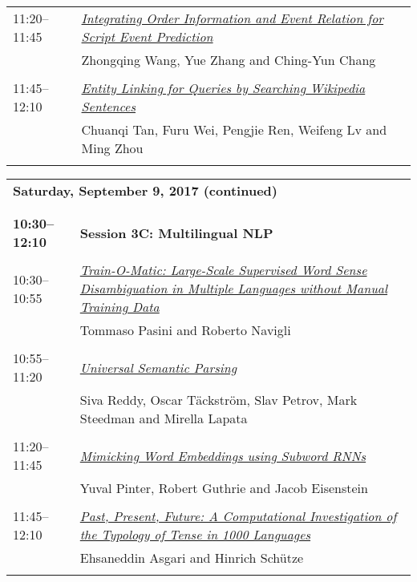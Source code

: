 \begin{tabular}{p{20mm}p{128mm}}
11:20--11:45 & \hyperlink{page.57}{\em Integrating Order Information and Event Relation for Script Event Prediction}\\
         & Zhongqing Wang, Yue Zhang and Ching-Yun Chang \\
\\

11:45--12:10 & \hyperlink{page.68}{\em Entity Linking for Queries by Searching Wikipedia Sentences}\\
         & Chuanqi Tan, Furu Wei, Pengjie Ren, Weifeng Lv and Ming Zhou \\
\\

\end{tabular}
\newpage
\begin{tabular}{p{20mm}p{128mm}}
\\
\multicolumn{2}{l}{\bf Saturday, September 9, 2017 (continued)} \\\\
\\{\bf 10:30--12:10} & {\bf Session 3C: Multilingual NLP } \\
\\
10:30--10:55 & \hyperlink{page.78}{\em Train-O-Matic: Large-Scale Supervised Word Sense Disambiguation in Multiple Languages without Manual Training Data}\\
         & Tommaso Pasini and Roberto Navigli \\
\\

10:55--11:20 & \hyperlink{page.89}{\em Universal Semantic Parsing}\\
         & Siva Reddy, Oscar T\"{a}ckstr\"{o}m, Slav Petrov, Mark Steedman and Mirella Lapata \\
\\

11:20--11:45 & \hyperlink{page.102}{\em Mimicking Word Embeddings using Subword RNNs}\\
         & Yuval Pinter, Robert Guthrie and Jacob Eisenstein \\
\\

11:45--12:10 & \hyperlink{page.113}{\em Past, Present, Future: A Computational Investigation of the Typology of Tense in 1000 Languages}\\
         & Ehsaneddin Asgari and Hinrich Sch\"{u}tze \\
\\


\end{tabular}
